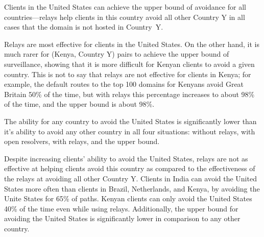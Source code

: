 \begin{finding}
Clients in the United States can achieve the upper bound of avoidance for all countries---relays help clients in this country avoid all other Country Y in all cases that the domain is not hosted in Country~Y.  
\end{finding}
\noindent
Relays are most effective for clients in the United States.  On the other hand, it is much rarer for (Kenya, Country Y) pairs to achieve the upper bound of surveillance, showing that it is more difficult for Kenyan clients to avoid a given country.  This is not to say that relays are not effective for clients in Kenya; for example, the default routes to the top 100 domains for Kenyans avoid Great Britain 50\% of the time, but with relays this percentage increases to about 98\% of the time, and the upper bound is about 98\%. 

\begin{finding}
The ability for any country to avoid the United States is significantly lower than it's ability to avoid any other country in all four situations: without relays, with open resolvers, with relays, and the upper bound. 
\end{finding}
\noindent
Despite increasing clients' ability to avoid the United States, relays are not as effective at helping clients avoid this country as compared to the effectiveness of the relays at avoiding all other Country Y.  Clients in India can avoid the United States more often than clients in Brazil, Netherlands, and Kenya, by avoiding the Unite States for 65\% of paths.  Kenyan clients can only avoid the United States 40\% of the time even while using relays.  Additionally, the upper bound for avoiding the United States is significantly lower in comparison to any other country.  

